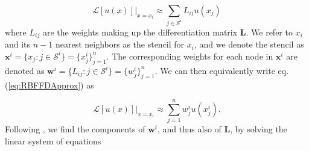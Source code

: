 \documentclass[10pt,a4paper]{article}
\begin{document}
\begin{equation}\label{eq:RBFFDApprox}
\mathcal{L}[u(x)]\big|_{x=x_i} \approx \sum_{j \in \mathcal{S}^i} L_{ij} u(x_j)
\end{equation}
where $L_{ij}$ are the weights making up the differentiation matrix $\mathbf{L}$.  We refer to $x_i$ and its $n-1$ nearest neighbors as the stencil for $x_i$, and we denote the stencil as $\mathbf{x}^i = \{x_j : j \in \mathcal{S}^i\} = \{x^i_j\}_{j=1}^n$. The corresponding weights for each node in $\mathbf{x}^i$ are denoted as $\mathbf{w}^i = \{L_{ij} : j \in \mathcal{S}^i\} = \{w^i_j\}_{j=1}^n$.  We can then equivalently write eq. (\ref{eq:RBFFDApprox}) as 

\begin{equation}\label{eq:RBFFDApproxAlt}
\mathcal{L}[u(x)]\big|_{x=x_i} \approx \sum_{j=1}^n w^i_j u(x^i_j).
\end{equation}
Following \citet{Fornberg2015}, we find the components of $\mathbf{w}^i$, and thus also of $\mathbf{L}$, by solving the linear system of equations
\end{document}
